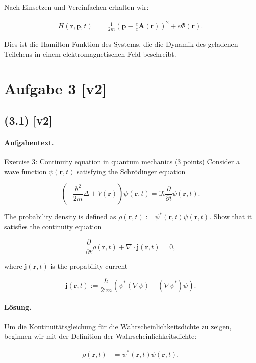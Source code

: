 \documentclass[11pt,a4paper]{article}
\begin{document}
Nach Einsetzen und Vereinfachen erhalten wir:

\begin{align*}
H(\mathbf{r}, \mathbf{p}, t) &= \frac{1}{2m} \left( \mathbf{p} - \frac{e}{c} \mathbf{A}(\mathbf{r}) \right)^2 + e \Phi(\mathbf{r}).
\end{align*}

Dies ist die Hamilton-Funktion des Systems, die die Dynamik des geladenen Teilchens in einem elektromagnetischen Feld beschreibt.


\section*{Aufgabe 3 [v2]}
\subsection*{(3.1) [v2]}
\paragraph{Aufgabentext.}
Exercise 3: Continuity equation in quantum mechanics (3 points)
Consider a wave function $\psi(\mathbf{r}, t)$ satisfying the Schrödinger equation

$$
\left(-\frac{\hbar^2}{2 m} \Delta+V(\mathbf{r})\right) \psi(\mathbf{r}, t)=\mathrm{i} \hbar \frac{\partial}{\partial t} \psi(\mathbf{r}, t) .
$$


The probability density is defined as $\rho(\mathbf{r}, t):=\psi^*(\mathbf{r}, t) \psi(\mathbf{r}, t)$. Show that it satisfies the continuity equation

$$
\frac{\partial}{\partial t} \rho(\mathbf{r}, t)+\nabla \cdot \mathbf{j}(\mathbf{r}, t)=0,
$$

where $\mathbf{j}(\mathbf{r}, t)$ is the propability current

$$
\mathbf{j}(\mathbf{r}, t):=\frac{\hbar}{2 \mathrm{i} m}\left(\psi^*(\nabla \psi)-\left(\nabla \psi^*\right) \psi\right) .
$$

\paragraph{Lösung.}
Um die Kontinuitätsgleichung für die Wahrscheinlichkeitsdichte zu zeigen, beginnen wir mit der Definition der Wahrscheinlichkeitsdichte:

\begin{align*}
\rho(\mathbf{r}, t) &= \psi^*(\mathbf{r}, t) \psi(\mathbf{r}, t).
\end{align*}
\end{document}
